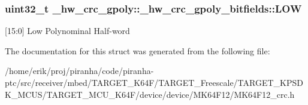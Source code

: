 \subsubsection[{\texorpdfstring{L\+OW}{LOW}}]{\setlength{\rightskip}{0pt plus 5cm}uint32\+\_\+t \+\_\+hw\+\_\+crc\+\_\+gpoly\+::\+\_\+hw\+\_\+crc\+\_\+gpoly\+\_\+bitfields\+::\+L\+OW}\hypertarget{struct__hw__crc__gpoly_1_1__hw__crc__gpoly__bitfields_a5ee68d2b17178cce8624af6756335cdf}{}\label{struct__hw__crc__gpoly_1_1__hw__crc__gpoly__bitfields_a5ee68d2b17178cce8624af6756335cdf}
\mbox{[}15\+:0\mbox{]} Low Polynominal Half-\/word 

The documentation for this struct was generated from the following file\+:\begin{DoxyCompactItemize}
\item 
/home/erik/proj/piranha/code/piranha-\/ptc/src/receiver/mbed/\+T\+A\+R\+G\+E\+T\+\_\+\+K64\+F/\+T\+A\+R\+G\+E\+T\+\_\+\+Freescale/\+T\+A\+R\+G\+E\+T\+\_\+\+K\+P\+S\+D\+K\+\_\+\+M\+C\+U\+S/\+T\+A\+R\+G\+E\+T\+\_\+\+M\+C\+U\+\_\+\+K64\+F/device/device/\+M\+K64\+F12/M\+K64\+F12\+\_\+crc.\+h\end{DoxyCompactItemize}
